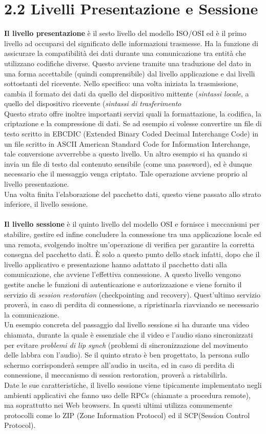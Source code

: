 \documentclass[a4paper, 11pt, oneside]{book}
\theoremstyle{plain}
\begin{document}
\section*{2.2 Livelli Presentazione e Sessione}
\textbf{Il livello presentazione} è il sesto livello del modello ISO/OSI ed è il primo livello ad occuparsi del significato delle informazioni trasmesse. Ha la funzione di assicurare la compatibilità dei dati durante una comunicazione tra entità che utilizzano codifiche diverse. Questo avviene tramite una traduzione del dato in una forma accettabile (quindi comprensibile) dal livello applicazione e dai livelli sottostanti del ricevente. Nello specifico: una volta iniziata la trasmissione, cambia il formato dei dati da quello del dispositivo mittente (\textit{sintassi locale}, a quello del dispositivo ricevente (\textit{sintassi di trasferimento}\\Questo strato offre inoltre importanti servizi quali la formattazione, la codifica, la criptazione e la compressione di dati. Se ad esempio si volesse convertire un file di testo scritto in EBCDIC (Extended Binary Coded Decimal Interchange Code) in un file scritto in  ASCII American Standard Code for Information Interchange, tale conversione avverrebbe a questo livello. Un altro esempio si ha quando si invia un file di testo dal contenuto sensibile (come una password), ed è dunque necessario che il messaggio venga criptato. Tale operazione avviene proprio al livello presentazione. \\Una volta finita l'elaborazione del pacchetto dati, questo viene passato allo strato inferiore, il livello sessione.\\\\
\textbf{Il livello sessione} è il quinto livello del modello OSI e fornisce i meccanismi per stabilire, gestire ed infine concludere la connessione tra una applicazione locale ed una remota, svolgendo inoltre un'operazione di verifica per garantire la corretta consegna del pacchetto dati. È solo a questo punto dello stack infatti, dopo che il livello applicativo e presentazione hanno adattato il pacchetto dati alla comunicazione, che avviene l'effettiva connessione. A questo livello vengono gestite anche le funzioni di autenticazione e autorizzazione e viene fornito il servizio di \textit{session restoration} (checkpointing and recovery). Quest'ultimo servizio proverà, in caso di perdita di connessione, a ripristinarla riavviando se necessario la comunicazione.\\ Un esempio concreta del passaggio dal livello sessione si ha durante una video chiamata, durante la quale è essenziale che il video e l'audio siano sincronizzati per evitare \textit{problemi di lip synch} (problemi di sincronizzazione del movimento delle labbra con l'audio). Se il quinto strato è ben progettato, la persona sullo schermo corrisponderà sempre all'audio in uscita, ed in caso di perdita di connessione, il meccanismo di session restoration, proverà a ristabilirla. \\Date le sue caratteristiche,  il livello sessione viene tipicamente implementato negli ambienti applicativi che fanno uso delle RPCs (chiamate a procedura remote), ma soprattutto nei Web browsers. In questi ultimi utilizza comunemente protocolli come lo 	ZIP (Zone Information Protocol) ed il SCP(Session Control Protocol).
\end{document}
